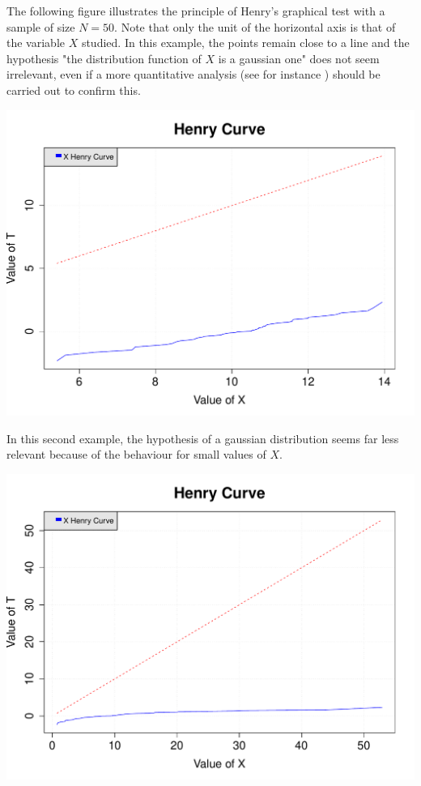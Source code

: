 {  The following figure illustrates the principle of Henry's graphical test with a sample of size $N=50$. Note that only the unit of the horizontal axis is that of the variable $X$ studied. In this example, the points remain close to a line and the hypothesis "the distribution function of $X$ is a gaussian one" does not seem irrelevant, even if a more quantitative analysis (see for instance ) should be carried out to confirm this.

  \begin{center}
    \includegraphics[scale=0.6]{Figures/henryGraph.pdf}
  \end{center}

  In this second example, the hypothesis of a gaussian distribution seems far less relevant because of the behaviour for small values of $X$.

  \begin{center}
    \includegraphics[scale=0.6]{Figures/henryBadGraph.pdf}
  \end{center}

}

